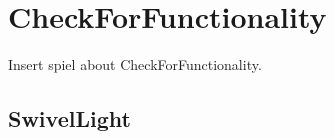 

\chapter{CheckForFunctionality}
Insert spiel about CheckForFunctionality.

\section{SwivelLight}


